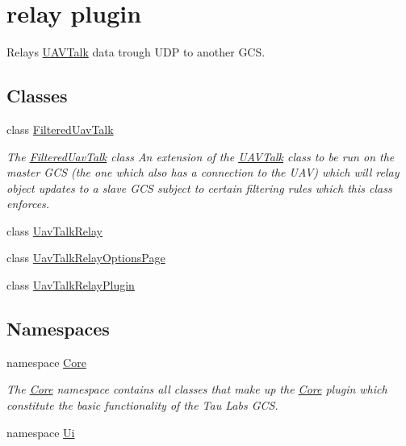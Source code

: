 \hypertarget{group___u_a_v_talk}{\section{relay plugin}
\label{group___u_a_v_talk}
}


\-Relays \hyperlink{class_u_a_v_talk}{\-U\-A\-V\-Talk} data trough \-U\-D\-P to another \-G\-C\-S.  


\subsection*{\-Classes}
\begin{DoxyCompactItemize}
\item 
class \hyperlink{class_filtered_uav_talk}{\-Filtered\-Uav\-Talk}
\begin{DoxyCompactList}\small\item\em \-The \hyperlink{class_filtered_uav_talk}{\-Filtered\-Uav\-Talk} class \-An extension of the \hyperlink{class_u_a_v_talk}{\-U\-A\-V\-Talk} class to be run on the master \-G\-C\-S (the one which also has a connection to the \-U\-A\-V) which will relay object updates to a slave \-G\-C\-S subject to certain filtering rules which this class enforces. \end{DoxyCompactList}\item 
class \hyperlink{class_uav_talk_relay}{\-Uav\-Talk\-Relay}
\item 
class \hyperlink{class_uav_talk_relay_options_page}{\-Uav\-Talk\-Relay\-Options\-Page}
\item 
class \hyperlink{class_uav_talk_relay_plugin}{\-Uav\-Talk\-Relay\-Plugin}
\end{DoxyCompactItemize}
\subsection*{\-Namespaces}
\begin{DoxyCompactItemize}
\item 
namespace \hyperlink{namespace_core}{\-Core}
\begin{DoxyCompactList}\small\item\em \-The \hyperlink{namespace_core}{\-Core} namespace contains all classes that make up the \hyperlink{namespace_core}{\-Core} plugin which constitute the basic functionality of the \-Tau \-Labs \-G\-C\-S. \end{DoxyCompactList}\item 
namespace \hyperlink{namespace_ui}{\-Ui}
\end{DoxyCompactItemize}
